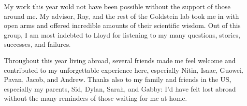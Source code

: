 
\begin{acknowledgements}      

My work this year wold not have been possible without the support of those around me.
My advisor, Ray, and the rest of the Goldstein lab took me in with open arms and offered incredible amounts of their scientific wisdom. 
Out of this group, I am most indebted to Lloyd for listening to my many questions, stories, successes, and failures.

Throughout this year living abroad, several friends made me feel welcome and contributed to my unforgettable experience here, especially Nitin, Isaac, Guowei, Pavan, Jacob, and Andrew.
Thanks also to my family and friends in the US, especially my parents, Sid, Dylan, Sarah, and Gabby: I'd have felt lost abroad without the many reminders of those waiting for me at home.

\end{acknowledgements}
